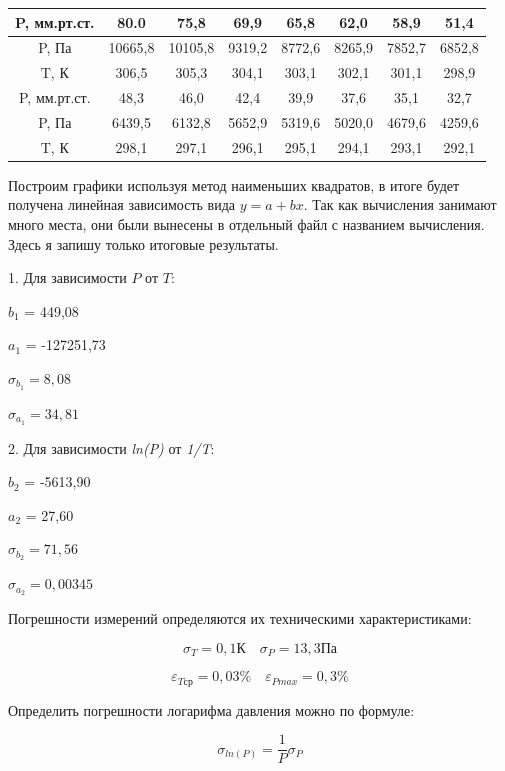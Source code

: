 \documentclass[12pt,a4paper]{article}
\begin{document}
\vspace{0.5cm}

\begin{tabular}{|c|c|c|c|c|c|c|c|}
\hline 
P, мм.рт.ст. & 80.0 & 75,8 & 69,9 & 65,8 & 62,0 & 58,9 & 51,4 \\ 
\hline 
P, Па & 10665,8 & 10105,8 & 9319,2 & 8772,6 & 8265,9 & 7852,7 & 6852,8 \\ 
\hline 
T, К & 306,5 & 305,3 & 304,1 & 303,1 & 302,1 & 301,1 & 298,9 \\ 
\hline 
\hline
P, мм.рт.ст. & 48,3 & 46,0 & 42,4 & 39,9 & 37,6 & 35,1 & 32,7 \\ 
\hline 
P, Па & 6439,5 & 6132,8 & 5652,9 & 5319,6 & 5020,0 & 4679,6 & 4259,6 \\ 
\hline 
T, К & 298,1 & 297,1 & 296,1 & 295,1 & 294,1 & 293,1 & 292,1 \\ 
\hline 
\end{tabular} 

\vspace{0.5cm}

Построим графики используя метод наименьших квадратов, в итоге будет получена линейная зависимость вида $y = a + bx$. Так как вычисления занимают много места, они были вынесены в отдельный файл с названием вычисления. Здесь я запишу только итоговые результаты.

1. Для зависимости $P$ от $T$:

$b_1$ = 449,08

$a_1$ = -127251,73

$\sigma_{b_1} = 8,08$

$\sigma_{a_1} = 34,81$

2. Для зависимости \textit{ln(P)} от \textit{1/T}:

$b_2$ = -5613,90

$a_2$ = 27,60

$\sigma_{b_2} = 71,56$ 

$\sigma_{a_2} = 0,00345$

\vspace{0.5cm}

Погрешности измерений определяются их техническими характеристиками:

\[\sigma_T = 0,1 \textit{К} \quad \sigma_P = 13,3 \textit{Па}\]

\[\varepsilon_{T\textit{ср}} = 0,03\% \quad \varepsilon_{Pmax} = 0,3\%\]

Определить погрешности логарифма давления можно по формуле:

\[\sigma_{ln(P)} = \frac{1}{P}\sigma_P\]
\end{document}

